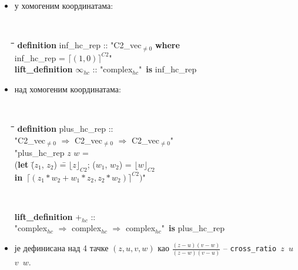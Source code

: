 \documentclass[slidestop, compress, mathserif, containsverbatim, xcolor=dvipsnames]{beamer}
\newcommand{\Repnzv}[1]{\ensuremath{\lfloor#1\rfloor_{C2}}}
\newcommand{\Absnzv}[1]{\ensuremath{\lceil#1\rceil^{C2}}}
\begin{document}
\begin{frame}{}
\begin{itemize}
\begin{footnotesize}
{    } \end{footnotesize}  \vfill
  \item {} у хомогеним координатама: \begin{footnotesize} {\tt
    \begin{tabbing}
      \hspace{5mm}\=\hspace{5mm}\=\hspace{5mm}\=\hspace{5mm}\=\hspace{5mm}\=\kill
      {\bf definition} inf\_hc\_rep :: "{}C2\_vec$_{\neq 0}$ {\bf where} \\
      \> inf\_hc\_rep = \Absnzv{(1, 0)}"\\
      {\bf lift\_definition} $\infty_{hc}$ :: "{}complex$_{hc}$"\ {\bf is} inf\_hc\_rep
    \end{tabbing}
  } \end{footnotesize}
  \end{itemize}
\end{frame}

\begin{frame}{}
  \begin{itemize}
  \item {} над хомогеним координатама:
    \begin{footnotesize} {\tt
      \begin{tabbing}
        \hspace{5mm}\=\hspace{5mm}\=\hspace{5mm}\=\hspace{5mm}\=\hspace{5mm}\=\kill
        {\bf definition} plus\_hc\_rep :: \\
        \>"{}C2\_vec$_{\neq 0}$ $\Rightarrow$ C2\_vec$_{\neq 0}$ $\Rightarrow$ C2\_vec$_{\neq 0}$"\\
         "{}plus\_hc\_rep $z$ $w$ = \\
        \>\> ({\bf l}\={\bf et} \= ($z_1$, $z_2$) \== $\Repnzv{z}$; ($w_1$, $w_2$) = $\Repnzv{w}$ \\
        \>\>\> {\bf in}\ $\Absnzv{(z_1*w_2 + w_1*z_2, z_2*w_2)})$"
      \end{tabbing}
      }
        {\tt
          \begin{tabbing}
            {\bf lift\_definition} $+_{hc}$ :: \\
            \hspace{5mm}"{}complex$_{hc}$ $\Rightarrow$ complex$_{hc}$ $\Rightarrow$ complex$_{hc}$"\ {\bf is} plus\_hc\_rep
          \end{tabbing}
        } \end{footnotesize} \vfill
  \item {} је дефинисана над 4 тачке $(z, u, v,
    w)$ као $\frac{(z-u)(v-w)}{(z-w)(v-u)}$ -- {\tt cross\_ratio $z$ $u$ $v$ $w$}.
  \end{itemize}
\end{frame}
\end{document}
